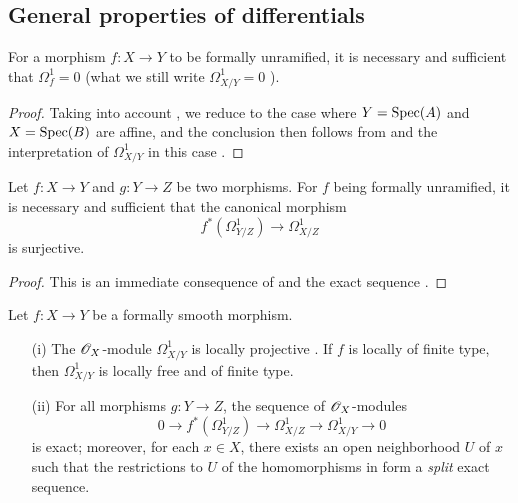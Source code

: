 \subsection{General properties of differentials}
\label{subsection:IV.17.2}

\begin{proposition}[17.2.1]
\label{IV.17.2.1}
For a morphism $f:X\to Y$ to be formally unramified, it is necessary and sufficient that $\Omega_f^1=0$ (what we still write $\Omega_{X/Y}^1=0$ ).  
\end{proposition}

\begin{proof}
Taking into account , we reduce to the case where $Y=\operatorname{Spec}(A)$ and $X=\operatorname{Spec}(B)$ are affine, and the conclusion then follows from  and the interpretation of $\Omega_{X/Y}^1$ in this case .
\end{proof}

\begin{corollary}[17.2.2]
\label{IV.17.2.2}
Let $f:X\to Y$ and $g:Y\to Z$ be two morphisms. 
For $f$ being formally unramified, it is necessary and sufficient that the canonical morphism 
\[
  f^*(\Omega^1_{Y/Z})\to \Omega^1_{X/Z}
\] is surjective.
\end{corollary}

\begin{proof}
This is an immediate consequence of  and the exact sequence .
\end{proof}

\begin{proposition}[17.2.3]
\label{IV.17.2.3}
Let $f:X\to Y$ be a formally smooth morphism.
\begin{enumerate}
  \item[{\rm(i)}] The $\mathscr{O}_X$-module $\Omega_{X/Y}^1$ is locally projective .
    If $f$ is locally of finite type, then $\Omega_{X/Y}^1$ is locally free and of finite type.
  \item[{\rm(ii)}] For all morphisms $g:Y\to Z$, the sequence  of $\mathscr{O}_X$-modules
\[
\label{IV.17.2.3.1}
  0\to f^*(\Omega_{Y/Z}^1)\to\Omega_{X/Z}^1\to\Omega_{X/Y}^1\to 0
  \tag{17.2.3.1}
\]
is exact; moreover, for each $x\in X$, there exists an open neighborhood $U$ of $x$ such that the restrictions to $U$ of the homomorphisms in  form a \emph{split} exact sequence.
\end{enumerate}
\end{proposition}

